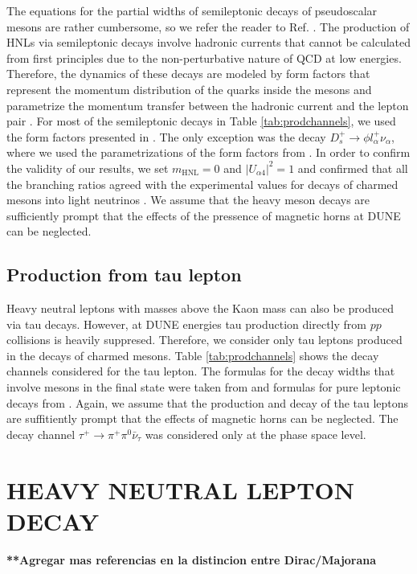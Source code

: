 \documentclass[aps,prd,twocolumn,superscriptaddress,amsmath,amssymb]{revtex4}
\begin{document}
The equations for the partial widths of semileptonic decays of pseudoscalar mesons are rather cumbersome, so we refer the reader to Ref. \cite{bondarenko2018}. The production of HNLs via semileptonic decays involve hadronic currents that cannot be calculated from first principles due to the non-perturbative nature of QCD at low energies. Therefore, the dynamics of these decays are modeled by form factors that represent the momentum distribution of the quarks inside the mesons and parametrize the momentum transfer between the hadronic current and the lepton pair \cite{richman1995leptonic}. For most of the semileptonic decays in Table \ref{tab:prodchannels}, we used the form factors presented in \cite{bondarenko2018}. The only exception was the decay $D_s^+\to\phi l_\alpha^+\nu_\alpha$, where we used the parametrizations of the form factors from \cite{aliev2004form}. In order to confirm the validity of our results, we set $m_{\text{HNL}}=0$ and $|U_{\alpha4}|^2=1$ and confirmed that all the branching ratios agreed with the experimental values for decays of charmed mesons into light neutrinos \cite{pdg2018}. We assume that the heavy meson decays are sufficiently prompt that the effects of the pressence of magnetic horns at DUNE can be neglected.

\subsection{Production from tau lepton}

Heavy neutral leptons with masses above the Kaon mass can also be produced via tau decays. However, at DUNE energies tau production directly from $pp$ collisions is heavily suppresed. Therefore, we consider only tau leptons produced in the decays of charmed mesons. Table \ref{tab:prodchannels} shows the decay channels considered for the tau lepton. The formulas for the decay widths that involve mesons in the final state were taken from \cite{bondarenko2018} and formulas for pure leptonic decays from \cite{shaposhnikov2007}. Again, we assume that the production and decay of the tau leptons are suffitiently prompt that the effects of magnetic horns can be neglected. The decay channel $\tau^+\to \pi^+\pi^0\bar{\nu}_\tau$ was considered only at the phase space level.

\section{HEAVY NEUTRAL LEPTON DECAY}
\textbf{**Agregar mas referencias en la distincion entre Dirac/Majorana}\\
\end{document}
